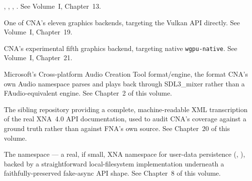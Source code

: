 \begin{description}
  , , ,
  . See Volume~I, Chapter~13.
\item[VULKAN] One of CNA's eleven graphics backends, targeting the Vulkan API directly. See
  Volume~I, Chapter~19.
\item[WEBGPU] CNA's experimental fifth graphics backend, targeting native \texttt{wgpu-native}.
  See Volume~I, Chapter~21.
\item[XACT] Microsoft's Cross-platform Audio Creation Tool format/engine, the format CNA's own
  Audio namespace parses and plays back through SDL3\_mixer rather than a FAudio-equivalent
  engine. See Chapter~2 of this volume.
\item[xna4-spec] The sibling repository providing a complete, machine-readable XML
  transcription of the real XNA~4.0 API documentation, used to audit CNA's coverage against a
  ground truth rather than against FNA's own source. See Chapter~20 of this volume.
\item[Storage] The  namespace --- a real, if
  small, XNA namespace for user-data persistence (,
  ), backed by a straightforward local-filesystem implementation
  underneath a faithfully-preserved fake-async API shape. See Chapter~8 of this volume.
\end{description}
